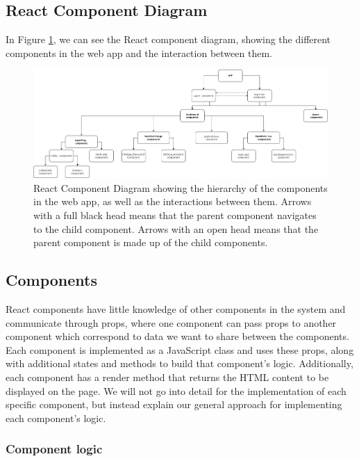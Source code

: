 \documentclass{l4proj}
\begin{document}
\subsection{React Component Diagram}
In Figure \ref{fig:react}, we can see the React component diagram, showing the different components in the web app and the interaction between them.
\begin{figure}
    \centering
    \includegraphics[width=1\linewidth]{images/react_comp_diagram.png}    

    \caption{React Component Diagram showing the hierarchy of the components in the web app, as well as the interactions between them. Arrows with a full black head means that the parent component navigates to the child component. Arrows with an open head means that the parent component is made up of the child components.}

    \label{fig:react} 
\end{figure}

\subsection{Components}
React components have little knowledge of other components in the system and communicate through props, where one component can pass props to another component which correspond to data we want to share between the components. Each component is implemented as a JavaScript class and uses these props, along with additional states and methods to build that component's logic. Additionally, each component has a render method that returns the HTML content to be displayed on the page. We will not go into detail for the implementation of each specific component, but instead explain our general approach for implementing each component's logic.

\subsubsection{Component logic}
\end{document}
